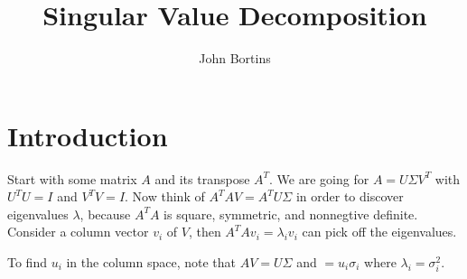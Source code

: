 \documentclass{article}
\title{Singular Value Decomposition}
\author{John Bortins}
\begin{document}
\maketitle{}

\section{Introduction}
Start with some matrix $A$ and its transpose $A^T$. We are going for $A=U\Sigma V^T$ with $U^T U=I$ and $V^T V=I$. Now think of $A^T AV=A^T U\Sigma$ in  order to discover eigenvalues $\lambda$, because $A^T A$ is square, symmetric, and  nonnegtive definite. Consider a column vector $v_i$ of $V$, then $A^T Av_i=\lambda_i v_i$ can pick off the eigenvalues.

To find $u_i$ in the column space, note that $AV=U\Sigma$ and $=u_i\sigma_i$ where $\lambda_i=\sigma_i^2$.
\end{document}
